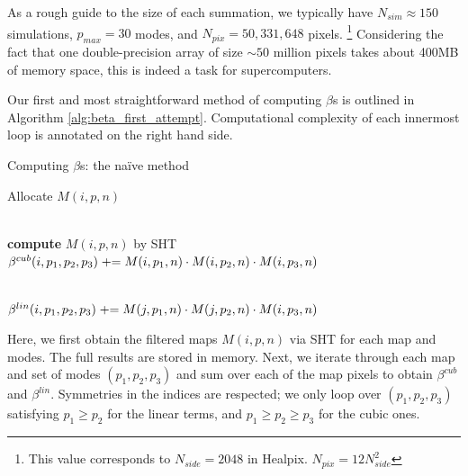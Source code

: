 As a rough guide to the size of each summation, we typically have $N_{sim} \approx 150$ simulations, $p_{max} = 30$ modes, and $N_{pix} = 50,331,648$ pixels. \footnote{This value corresponds to $N_{side} = 2048$ in Healpix. $N_{pix} = 12 N_{side}^2$} Considering the fact that one double-precision array of size $\sim 50$ million pixels takes about 400MB of memory space, this is indeed a task for supercomputers.

Our first and most straightforward method of computing $\beta$s is outlined in Algorithm \ref{alg:beta_first_attempt}. Computational complexity of each innermost loop is annotated on the right hand side.

\begin{algorithm}[htbp]
	\caption{Computing $\beta$s: the na\"ive method}
	\label{alg:beta_first_attempt}
	\begin{algorithmic}[1] %
		\State Allocate $M(i,p,n)$

		\\
				\State \textbf{compute} $M(i,p,n)$ by SHT
			\EndFor
		\EndFor {}
		\\
		
					\State $\beta^{cub}(i, p_1, p_2, p_3) \mathrel{+}= M(i,p_1,n) \cdot M(i,p_2,n) \cdot M(i,p_3,n)$
				\EndFor
			\EndFor
		\EndFor

		\\	
						\State $\beta^{lin}(i, p_1, p_2, p_3) \mathrel{+}= M(j,p_1,n) \cdot M(j,p_2,n) \cdot M(i,p_3,n)$
					\EndFor
				\EndFor
			\EndFor
		\EndFor

	\end{algorithmic}
\end{algorithm}

Here, we first obtain the filtered maps $M(i,p,n)$ via SHT for each map and modes. The full results are stored in memory. Next, we iterate through each map and set of modes $(p_1, p_2, p_3)$ and sum over each of the map pixels to obtain $\beta^{cub}$ and $\beta^{lin}$. Symmetries in the indices are respected; we only loop over $(p_1,p_2,p_3)$ satisfying $p_1\ge p_2$ for the linear terms, and $p_1\ge p_2\ge p_3$ for the cubic ones.


